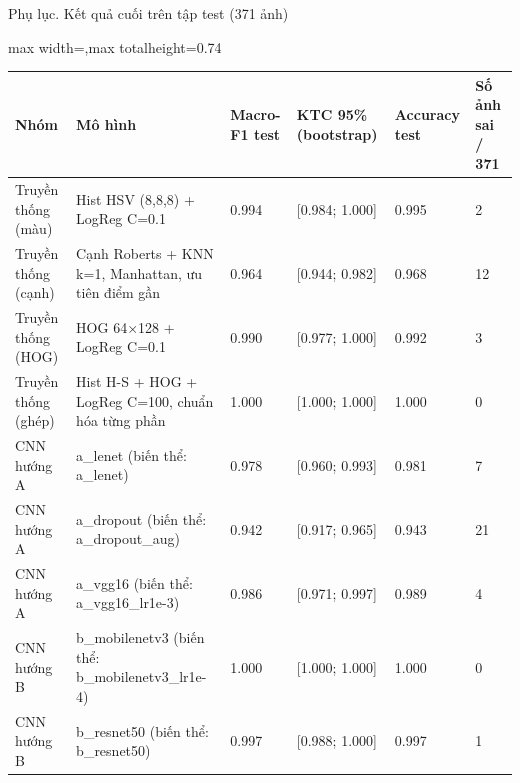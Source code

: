\documentclass[aspectratio=169,10pt]{beamer}
\begin{document}
\begin{frame}{Phụ lục. Kết quả cuối trên tập test (371 ảnh)}
\begin{center}\begin{adjustbox}{max width=\linewidth,max totalheight=0.74\textheight}
\begin{tabular}{llllll}\toprule
\textbf{Nhóm} & \textbf{Mô hình} & \textbf{Macro-F1 test} & \textbf{KTC 95\% (bootstrap)} & \textbf{Accuracy test} & \textbf{Số ảnh sai / 371} \\ \midrule
Truyền thống (màu) & Hist HSV (8,8,8) + LogReg C=0.1 & 0.994 & [0.984; 1.000] & 0.995 & 2 \\
Truyền thống (cạnh) & Cạnh Roberts + KNN k=1, Manhattan, ưu tiên điểm gần & 0.964 & [0.944; 0.982] & 0.968 & 12 \\
Truyền thống (HOG) & HOG 64$\times$128 + LogReg C=0.1 & 0.990 & [0.977; 1.000] & 0.992 & 3 \\
Truyền thống (ghép) & Hist H-S + HOG + LogReg C=100, chuẩn hóa từng phần & 1.000 & [1.000; 1.000] & 1.000 & 0 \\
CNN hướng A & a\_lenet (biến thể: a\_lenet) & 0.978 & [0.960; 0.993] & 0.981 & 7 \\
CNN hướng A & a\_dropout (biến thể: a\_dropout\_aug) & 0.942 & [0.917; 0.965] & 0.943 & 21 \\
CNN hướng A & a\_vgg16 (biến thể: a\_vgg16\_lr1e-3) & 0.986 & [0.971; 0.997] & 0.989 & 4 \\
CNN hướng B & b\_mobilenetv3 (biến thể: b\_mobilenetv3\_lr1e-4) & 1.000 & [1.000; 1.000] & 1.000 & 0 \\
CNN hướng B & b\_resnet50 (biến thể: b\_resnet50) & 0.997 & [0.988; 1.000] & 0.997 & 1 \\
\bottomrule\end{tabular}
\end{adjustbox}\end{center}
\end{frame}
\end{document}
